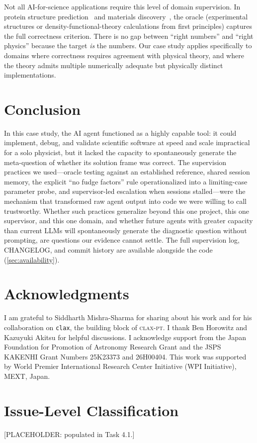 \documentclass{article}
\newcommand{\claxpt}{\textsc{clax-pt}\xspace}
\begin{document}
Not all AI-for-science applications require this level of domain supervision. In protein structure prediction~\citep{jumper2021} and materials discovery~\citep{merchant2023}, the oracle (experimental structures or density-functional-theory calculations from first principles) captures the full correctness criterion. There is no gap between ``right numbers'' and ``right physics'' because the target \emph{is} the numbers. Our case study applies specifically to domains where correctness requires agreement with physical theory, and where the theory admits multiple numerically adequate but physically distinct implementations.

\section{Conclusion}
\label{sec:conclusion}

In this case study, the AI agent functioned as a highly capable tool: it could implement, debug, and validate scientific software at speed and scale impractical for a solo physicist, but it lacked the capacity to spontaneously generate the meta-question of whether its solution frame was correct. The supervision practices we used---oracle testing against an established reference, shared session memory, the explicit ``no fudge factors'' rule operationalized into a limiting-case parameter probe, and supervisor-led escalation when sessions stalled---were the mechanism that transformed raw agent output into code we were willing to call trustworthy. Whether such practices generalize beyond this one project, this one supervisor, and this one domain, and whether future agents with greater capacity than current LLMs will spontaneously generate the diagnostic question without prompting, are questions our evidence cannot settle. The full supervision log, CHANGELOG, and commit history are available alongside the code (\cref{sec:availability}).

\section*{Acknowledgments}

I am grateful to Siddharth Mishra-Sharma for sharing about his work and for his collaboration on \texttt{clax}, the building block of \claxpt. I thank Ben Horowitz and Kazuyuki Akitsu for helpful discussions. I acknowledge support from the Japan Foundation for Promotion of Astronomy Research Grant and the JSPS KAKENHI Grant Numbers 25K23373 and 26H00404. This work was supported by World Premier International Research Center Initiative (WPI Initiative), MEXT, Japan.




\appendix

\section{Issue-Level Classification}
\label{app:bug-table}

[PLACEHOLDER: populated in Task 4.1.]
\end{document}
